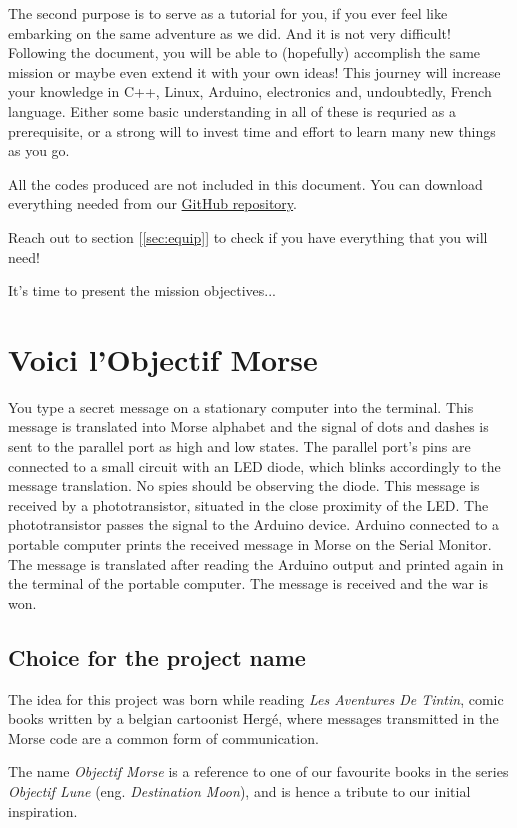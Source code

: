 \documentclass[12pt]{report}
\begin{document}
The second purpose is to serve as a tutorial for you, if you ever feel like embarking on the same adventure as we did. And it is not very difficult! Following the document, you will be able to (hopefully) accomplish the same mission or maybe even extend it with your own ideas! This journey will increase your knowledge in C++, Linux, Arduino, electronics and, undoubtedly, French language. Either some basic understanding in all of these is requried as a prerequisite, or a strong will to invest time and effort to learn many new things as you go.

All the codes produced are not included in this document. You can download everything needed from our \href{https://github.com/camillejr/objectif_morse}{GitHub repository}.

Reach out to section [\ref{sec:equip}] to check if you have everything that you will need!

It's time to present the mission objectives...

\section{Voici l'Objectif Morse}

You type a secret message on a stationary computer into the terminal. This message is translated into Morse alphabet and the signal of dots and dashes is sent to the parallel port as high and low states. The parallel port's pins are connected to a small circuit with an LED diode, which blinks accordingly to the message translation. No spies should be observing the diode. This message is received by a phototransistor, situated in the close proximity of the LED. The phototransistor passes the signal to the Arduino device. Arduino connected to a portable computer prints the received message in Morse on the Serial Monitor. The message is translated after reading the Arduino output and printed again in the terminal of the portable computer. The message is received and the war is won.

\subsection{Choice for the project name}

The idea for this project was born while reading \textit{Les Aventures De Tintin}, comic books written by a belgian cartoonist Hergé, where messages transmitted in the Morse code are a common form of communication. 

The name \textit{Objectif Morse} is a reference to one of our favourite books in the series \textit{Objectif Lune} (eng. \textit{Destination Moon}), and is hence a tribute to our initial inspiration.
\end{document}
